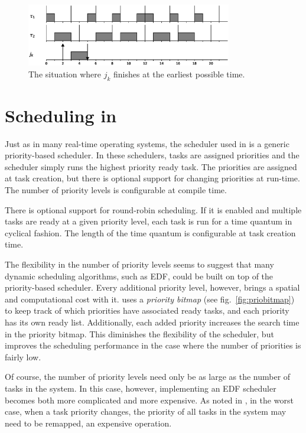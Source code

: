 \begin{figure}[htpb]
    \centering
    \includegraphics[width=0.8\textwidth]{figures/optimaldeadline.eps}
    \caption{The situation where $j_k$ finishes at the earliest possible time.}
    \label{fig:tbsoptimaldeadline}
\end{figure}

\section{Scheduling in \ucosiii}
Just as in many real-time operating systems, the scheduler used in \ucosiii is a generic priority-based scheduler. In these schedulers, tasks are assigned priorities and the scheduler simply runs the highest priority ready task. The priorities are assigned at task creation, but there is optional support for changing priorities at run-time. The number of priority levels is configurable at compile time.

There is optional support for round-robin scheduling. If it is enabled and multiple tasks are ready at a given priority level, each task is run for a time quantum in cyclical fashion. The length of the time quantum is configurable at task creation time.

The flexibility in the number of priority levels seems to suggest that many dynamic scheduling algorithms, such as EDF, could be built on top of the priority-based scheduler. Every additional priority level, however, brings a spatial and computational cost with it. \ucos uses a \textit{priority bitmap} (see fig.~\ref{fig:priobitmap}) to keep track of which priorities have associated ready tasks, and each priority has its own ready list. Additionally, each added priority increases the search time in the priority bitmap. This diminishes the flexibility of the scheduler, but improves the scheduling performance in the case where the number of priorities is fairly low.

Of course, the number of priority levels need only be as large as the number of tasks in the system. In this case, however, implementing an EDF scheduler becomes both more complicated and more expensive. As noted in \textcite[\S 2]{Buttazzo2005}, in the worst case, when a task priority changes, the priority of all tasks in the system may need to be remapped, an expensive operation.

